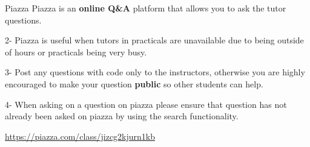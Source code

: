\documentclass[week2]{csse1001}
\begin{document}
\begin{topic}{Piazza}
Piazza is an \textbf{online Q\&A} platform that allows you to ask the tutor questions.

\begin{subtopic}{2-}
Piazza is useful when tutors in practicals are unavailable due to being outside of hours or practicals being very busy.
\end{subtopic}

\begin{subtopic}{3-}
Post any questions with code only to the instructors, otherwise you are highly encouraged to make your question \textbf{public} so other students can help.
\end{subtopic}

\begin{subtopic}{4-}
When asking on a question on piazza please ensure that question has not already been asked on piazza by using the search functionality.
\end{subtopic}

\url{https://piazza.com/class/jizcg2kjurn1kb}
\end{topic}
\end{document}

